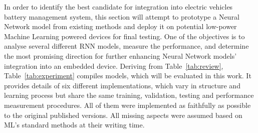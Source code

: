 In order to identify the best candidate for integration into electric vehicles battery management system, this section will attempt to prototype a Neural Network model from existing methods and deploy it on potential low-power Machine Learning powered devices for final testing.
One of the objectives is to analyse several different RNN models, measure the performance, and determine the most promising direction for further enhancing Neural Network models' integration into an embedded device.
Deriving from \mbox{Table~\ref{tab:review}}, \mbox{Table~\ref{tab:experiment}} compiles models, which will be evaluated in this work.
It provides details of six different implementations, which vary in structure and learning process but share the same training, validation, testing and performance measurement procedures.
All of them were implemented as faithfully as possible to the original published versions.
All missing aspects were assumed based on ML's standard methods at their writing time.
